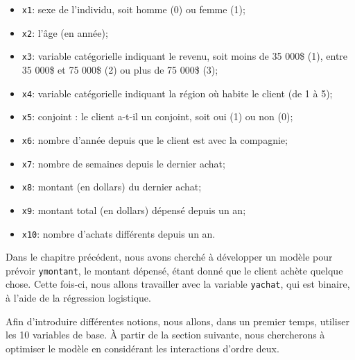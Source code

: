\documentclass[
  11pt,
  letterpaper,
]{book}
\providecommand{\tightlist}{%
  \setlength{\itemsep}{0pt}\setlength{\parskip}{0pt}}\usepackage{longtable,booktabs,array}
\theoremstyle{definition}
\theoremstyle{remark}
\begin{document}
\begin{itemize}
\tightlist
\item
  \texttt{x1}: sexe de l'individu, soit homme (0) ou femme (1);
\item
  \texttt{x2}: l'âge (en année);
\item
  \texttt{x3}: variable catégorielle indiquant le revenu, soit moins de
  35 000\$ (1), entre 35 000\$ et 75 000\$ (2) ou plus de 75 000\$ (3);
\item
  \texttt{x4}: variable catégorielle indiquant la région où habite le
  client (de 1 à 5);
\item
  \texttt{x5}: conjoint : le client a-t-il un conjoint, soit oui (1) ou
  non (0);
\item
  \texttt{x6}: nombre d'année depuis que le client est avec la
  compagnie;
\item
  \texttt{x7}: nombre de semaines depuis le dernier achat;
\item
  \texttt{x8}: montant (en dollars) du dernier achat;
\item
  \texttt{x9}: montant total (en dollars) dépensé depuis un an;
\item
  \texttt{x10}: nombre d'achats différents depuis un an.
\end{itemize}

Dans le chapitre précédent, nous avons cherché à développer un modèle
pour prévoir \texttt{ymontant}, le montant dépensé, étant donné que le
client achète quelque chose. Cette fois-ci, nous allons travailler avec
la variable \texttt{yachat}, qui est binaire, à l'aide de la régression
logistique.

Afin d'introduire différentes notions, nous allons, dans un premier
temps, utiliser les 10 variables de base. À partir de la section
suivante, nous chercherons à optimiser le modèle en considérant les
interactions d'ordre deux.
\end{document}
